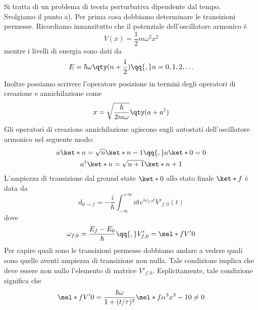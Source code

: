 \begin{soluzione}
   Si tratta di un problema di teoria perturbativa dipendente dal tempo.\\
   Svolgiamo il punto a). Per prima cosa dobbiamo determinare le transizioni permesse. Ricordiamo innanzitutto che il potenziale dell'oscillatore armonico è
   \begin{equation*}
      V(x)=\frac{1}{2}m\omega^2 x^2
   \end{equation*}
   mentre i livelli di energia sono dati da
   \begin{equation*}
      E=\hbar\omega \qty(n + \frac{1}{2})
      \qq{,}
      n=0,1,2,\ldots
   \end{equation*}
   Inoltre possiamo scrivere l'operatore posizione in termini degli operatori di creazione e annichilazione come
   \begin{equation*}
      x=\sqrt{\frac{\hbar}{2m\omega}} \qty( a + a^{\dag} )
   \end{equation*}
   Gli operatori di creazione annichilazione agiscono sugli autostati dell'oscillatore armonico nel seguente modo:
   \begin{gather*}
      a \ket*{n}
      =\sqrt{n} \ket*{n - 1}
      \qq{,}
      a \ket*{0}=0
      \\
      a^{\dag} \ket*{n}
      =\sqrt{n + 1} \ket*{n + 1}
   \end{gather*}
   L'ampiezza di transizione dal ground state $\ket*{0}$ allo stato finale $\ket*{f}$ è data da
   \begin{equation*}
      d_{0 \to f}
      =-\frac{i}{\hbar} \int_{-\infty}^{+\infty} \dd{t} e^{i \omega_{f,0} t} V'_{f,0}(t)
   \end{equation*}
   dove
   \begin{equation*}
      \omega_{f,0}
      =\frac{E_f - E_0}{\hbar}
      \qq{,}
      V'_{f,0}
      =\mel*{f}{V'}{0}
   \end{equation*}
   Per capire quali sono le transizioni permesse dobbiamo andare a vedere quali sono quelle aventi ampiezza di transizione non nulla. Tale condizione implica che deve essere non nullo l'elemento di matrice $V'_{f,0}$. Esplicitamente, tale condizione significa che
   \begin{gather*}
      \mel*{f}{V'}{0}
      =\frac{\hbar\omega}{1 + (t/\tau)^2} \mel*{f}{\alpha^3 x^3 - 1}{0}
      \neq 0
      \\[0.1cm]

\end{gather*}
\end{soluzione}
